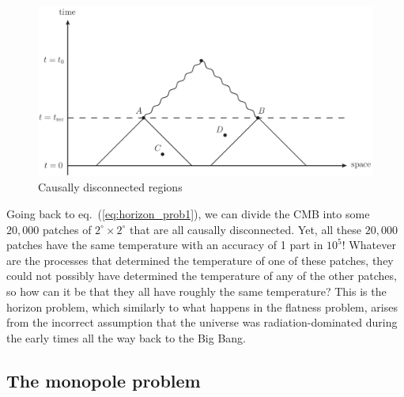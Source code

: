 \begin{figure}[ht]
\begin{center}
\includegraphics[scale=0.5]{Draw/lec12_4.png}
\end{center}
\caption{Causally disconnected regions}
\label{fig:lec12_4}
\end{figure}

Going back to eq.\ (\ref{eq:horizon_prob1}), we can divide the CMB into some $20,000$ patches of $2^{\circ}\times2^{\circ}$ that are all causally disconnected. Yet, all these $20,000$ patches have the same temperature with an accuracy of 1 part in $10^5$! Whatever are the processes that determined the temperature of one of these patches, they could not possibly have determined the temperature of any of the other patches, so how can it be that they all have roughly the same temperature? This is the horizon problem, which similarly to what happens in the flatness problem, arises from the incorrect assumption that the universe was radiation-dominated during the early times all the way back to the Big Bang.

\subsection{The monopole problem}

